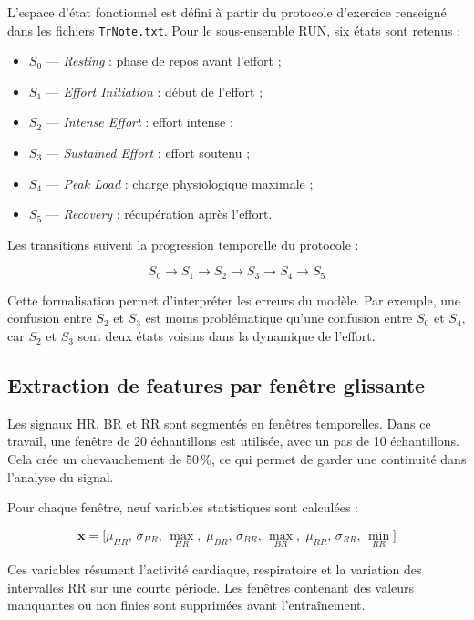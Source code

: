 \documentclass[12pt,a4paper]{article}
\begin{document}
L'espace d'état fonctionnel est défini à partir du protocole d'exercice
renseigné dans les fichiers \texttt{TrNote.txt}. Pour le sous-ensemble RUN,
six états sont retenus :

\begin{itemize}[leftmargin=1.5em, itemsep=0pt]
  \item $S_0$ — \textit{Resting} : phase de repos avant l'effort ;
  \item $S_1$ — \textit{Effort Initiation} : début de l'effort ;
  \item $S_2$ — \textit{Intense Effort} : effort intense ;
  \item $S_3$ — \textit{Sustained Effort} : effort soutenu ;
  \item $S_4$ — \textit{Peak Load} : charge physiologique maximale ;
  \item $S_5$ — \textit{Recovery} : récupération après l'effort.
\end{itemize}

Les transitions suivent la progression temporelle du protocole :

\[
S_0 \rightarrow S_1 \rightarrow S_2 \rightarrow S_3 \rightarrow S_4 \rightarrow S_5
\]

Cette formalisation permet d'interpréter les erreurs du modèle. Par exemple,
une confusion entre $S_2$ et $S_3$ est moins problématique qu'une confusion
entre $S_0$ et $S_4$, car $S_2$ et $S_3$ sont deux états voisins dans la
dynamique de l'effort.

\subsection{Extraction de features par fenêtre glissante}
\label{subsec:features}

Les signaux HR, BR et RR sont segmentés en fenêtres temporelles. Dans ce
travail, une fenêtre de 20 échantillons est utilisée, avec un pas de 10
échantillons. Cela crée un chevauchement de 50\,\%, ce qui permet de garder
une continuité dans l'analyse du signal.

Pour chaque fenêtre, neuf variables statistiques sont calculées :

\begin{equation}
\mathbf{x} = \bigl[\mu_{HR},\,\sigma_{HR},\,\max_{HR},\;
              \mu_{BR},\,\sigma_{BR},\,\max_{BR},\;
              \mu_{RR},\,\sigma_{RR},\,\min_{RR}\bigr]
\end{equation}

Ces variables résument l'activité cardiaque, respiratoire et la variation
des intervalles RR sur une courte période. Les fenêtres contenant des
valeurs manquantes ou non finies sont supprimées avant l'entraînement.
\end{document}
